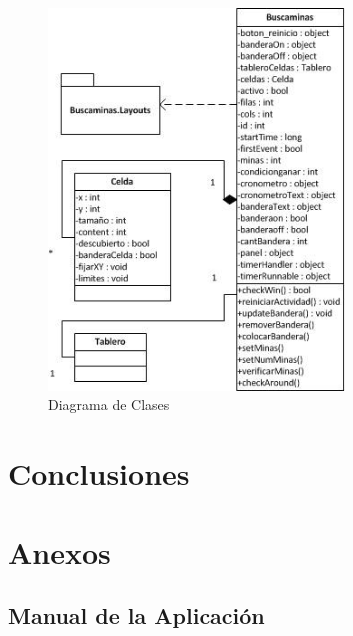 \documentclass[11pt]{article} %
\begin{document}
\begin{center}

	\begin{figure}[h!]
  		\centering
    		\includegraphics[width=0.7\textwidth]{imagenes/diagramaClases.jpg}
  		\caption{Diagrama de Clases}
		\label{fig:diagclases}
	\end{figure}
\end{center}

\newpage
\thispagestyle{empty}

\section{\textbf{Conclusiones}}

\newpage
\thispagestyle{empty}

\section{\textbf{Anexos}}
\subsection{\textbf{Manual de la Aplicaci\' on}}
\end{document}

